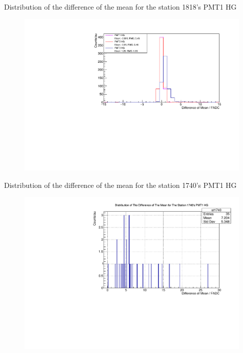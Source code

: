\documentclass[aspectratio=169]{beamer}
\begin{document}
\begin{frame}
  Distribution of the difference of the mean for the station 1818's PMT1 HG
  \begin{figure}[h]
    \centering
    \includegraphics[width=1\textwidth]{..//plots/blDiffMeanSt1818.pdf}
    \end{figure}
\end{frame}

\begin{frame}
  Distribution of the difference of the mean for the station 1740's PMT1 HG
  \begin{figure}[h]
    \centering
    \includegraphics[width=1\textwidth]{..//plots/blDiffMeanSt1740.pdf}
    \end{figure}
\end{frame}
\end{document}
